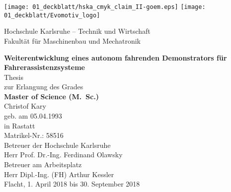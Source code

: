 \renewcommand{\maketitle}{%

\begin{titlepage}
	\thispagestyle{empty}
	\oddsidemargin14mm
	\evensidemargin4mm
	\centering
	\begin{center}
		

		\texttt{[image: 01\_deckblatt/hska\_cmyk\_claim\_II-goem.eps]} \hfill
		\texttt{[image: 01\_deckblatt/Evomotiv\_logo]}\\ 
		
		\vspace{2em}
		
		\large{Hochschule Karlsruhe -- Technik und Wirtschaft \\ Fakultät für Maschinenbau und Mechatronik}\\
		
		\vspace{10mm}
	
		\textsf{
		{\huge  \bfseries Weiterentwicklung eines autonom fahrenden Demonstrators für Fahrerassistenzsysteme\\}}
		\vspace{15mm}
		\large{Thesis \\zur Erlangung des Grades \\ \vspace{1ex}
		\bfseries Master of Science (M.~Sc.)}
		\vspace{15mm}\\
		Christof Kary\\
		geb. am 05.04.1993\\
		in Rastatt\\
		Matrikel-Nr.: 58516\\
		
		\vspace{15mm}
		Betreuer der Hochschule Karlsruhe\\
		Herr Prof. Dr.-Ing. Ferdinand Olawsky\\
		\vspace{1em}
		Betreuer am Arbeitsplatz\\
		Herr Dipl.-Ing. (FH) Arthur Kessler\\
		
		\vspace{10mm}
		Flacht, 1. April 2018 bis 30. September 2018\\

	\end{center}

\end{titlepage}
}


\maketitle
